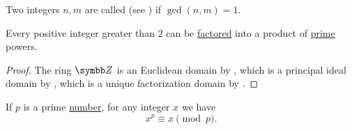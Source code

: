 \begin{definition}\label{def:coprime_numbers}
  Two integers \( n, m \) are called  (see ) if \( \gcd(n, m) = 1 \).
\end{definition}

\begin{theorem}\label{thm:fundamental_theorem_of_arithmetic}
  Every positive integer greater than \( 2 \) can be \hyperref[def:factorization_in_ring]{factored} into a product of \hyperref[def:prime_number]{prime} powers.
\end{theorem}
\begin{proof}
  The ring \( \BZ \) is an Euclidean domain by , which is a principal ideal domain by , which is a unique factorization domain by .
\end{proof}

\begin{proposition}\label{thm:fermats_little_theorem}
  If \( p \) is a prime \hyperref[def:prime_number]{number}, for any integer \( x \) we have
  \begin{equation*}
    x^p \equiv x \pmod p.
  \end{equation*}
\end{proposition}
